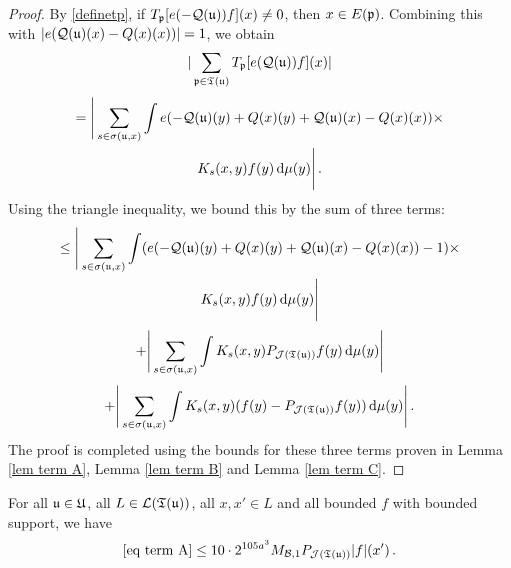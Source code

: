 {\begin{proof}
    By \eqref{definetp}, if $T_{\mathfrak p}[ e(-\mathcal{Q}(\mathfrak u))f](x) \ne 0$, then $x \in E(\mathfrak p)$. Combining this with $|e(\mathcal{Q}(\mathfrak u)(x)-{Q}(x)(x))| = 1$, we obtain
    $$
        |\sum_{\mathfrak p \in \mathfrak T(\mathfrak u)} T_{\mathfrak p}[ e(\mathcal{Q}(\mathfrak u))f](x)|
    $$
    \begin{multline*}
        = \Bigg| \sum_{s \in \sigma(\mathfrak u, x)} \int e(-\mathcal{Q}(\mathfrak u)(y) + {Q}(x)(y) + \mathcal{Q}(\mathfrak u)(x) -{Q}(x)(x))\times\\
        K_s(x,y)f(y) \, \mathrm{d}\mu(y) \Bigg|\,.
    \end{multline*}
    Using the triangle inequality, we bound this by the sum of three terms:
    \begin{multline}
        \label{eq term A}
        \le \Bigg| \sum_{s \in \sigma(\mathfrak u, x)} \int (e(-\mathcal{Q}(\mathfrak u)(y) + {Q}(x)(y) + \mathcal{Q}(\mathfrak u)(x) -{Q}(x)(x))-1)\times\\
        K_s(x,y)f(y) \, \mathrm{d}\mu(y) \Bigg|
    \end{multline}
    \begin{equation}
        \label{eq term B}
        + \Bigg| \sum_{s \in \sigma(\mathfrak u, x)} \int K_s(x,y) P_{\mathcal{J}(\mathfrak T(\mathfrak u))} f(y) \, \mathrm{d}\mu(y) \Bigg|
    \end{equation}
    \begin{equation}
        \label{eq term C}
        + \Bigg| \sum_{s \in \sigma(\mathfrak u, x)} \int K_s(x,y) (f(y) - P_{\mathcal{J}(\mathfrak T(\mathfrak u))} f(y)) \, \mathrm{d}\mu(y) \Bigg|\,.
    \end{equation}
    The proof is completed using the bounds for these three terms proven in Lemma \ref{lem term A}, Lemma \ref{lem term B} and Lemma \ref{lem term C}.
\end{proof}

\begin{lemma}
    \label{lem term A}
    For all $\mathfrak u \in \mathfrak U$, all $L \in \mathcal{L}(\mathfrak T(\mathfrak u))$, all $x, x' \in L$ and all bounded $f$ with bounded support, we have
    $$
        \eqref{eq term A} \le 10 \cdot 2^{105a^3} M_{\mathcal{B}, 1}P_{\mathcal{J}(\mathfrak T(\mathfrak u))}|f|(x')\,.
    $$
\end{lemma}

}
